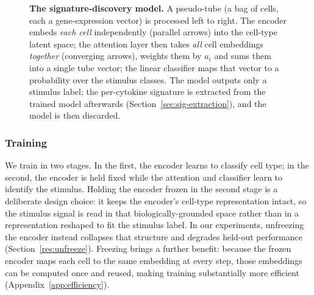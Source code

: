 \documentclass[11pt,a4paper]{article}
\begin{document}
\begin{figure}[H]
\caption{\textbf{The signature-discovery model.} A pseudo-tube (a bag of cells, each a
gene-expression vector) is processed left to right. The encoder embeds \emph{each cell}
independently (parallel arrows) into the cell-type latent space; the attention layer then
takes \emph{all} cell embeddings \emph{together} (converging arrows), weights them by
$a_i$ and sums them into a single tube vector; the linear classifier maps that vector to a
probability over the stimulus classes. The model outputs only a stimulus label; the
per-cytokine signature is extracted from the trained model afterwards
(Section~\ref{sec:sig-extraction}), and the model is then discarded.}
\label{fig:model}
\end{figure}

\subsubsection{Training}
\label{sec:sig-training}
We train in two stages. In the first, the encoder learns to classify cell type; in the second, the encoder is held fixed while the attention and classifier learn to identify the stimulus. Holding the encoder frozen in the second stage is a deliberate design choice: it keeps the encoder's cell-type representation intact, so the stimulus signal is read in that biologically-grounded space rather than in a representation reshaped to fit the stimulus label. In our experiments, unfreezing the encoder instead collapses that structure and degrades held-out performance (Section~\ref{res:unfreeze}). Freezing brings a further benefit: because the frozen encoder maps each cell to the same embedding at every step, those embeddings can be computed once and reused, making training substantially more efficient (Appendix~\ref{app:efficiency}).
\end{document}
